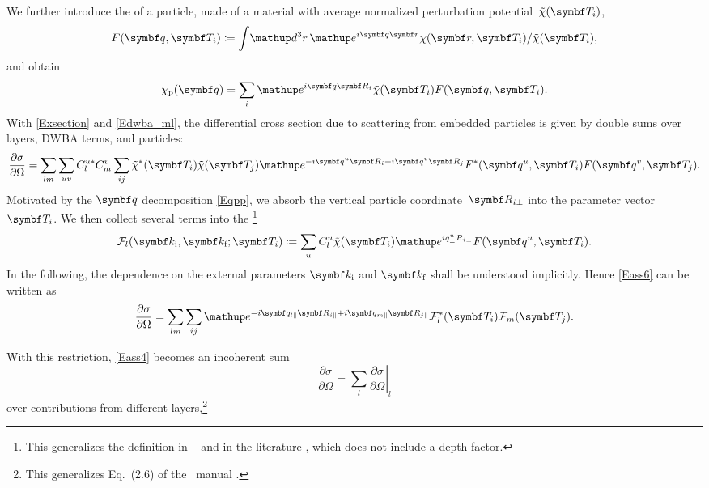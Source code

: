 We further introduce the 
%
of a particle,
made of a material
with average normalized perturbation potential~$\tilde\chi(\v{T}_i)$,
\begin{equation}\label{EFFdef}
  F(\q,\v{T}_i) \coloneqq  \int\!\d^3r\,\e^{i\q\r}\chi(\r,\v{T}_i)/\tilde\chi(\v{T}_i),
\end{equation}
and obtain
\begin{equation}
  \chi_\text{p}(\q) = \sum_i \e^{i\q\R_i} \tilde\chi(\v{T}_i) F(\q,\v{T}_i).
\end{equation}
With \cref{Exsection} and \cref{Edwba_ml},
the differential cross section due to scattering from embedded particles is
given by double sums over layers, DWBA terms, and particles:
\begin{equation}\label{Eass6}
  \frac{\partial\sigma}{\partial\Omega}
  = \sum_{lm} \sum_{uv} C^{u*}_l C^v_m \sum_{ij} \tilde\chi^*(\v{T}_i) \tilde\chi(\v{T}_j)
    \e^{-i\q^u \R_i +i \q^v \R_j} F^*(\q^u,\v{T}_i) F(\q^v,\v{T}_j).
\end{equation}
Motivated by the $\q$ decomposition \cref{Eqpp},
we absorb the vertical particle coordinate~$\R_{i\perp}$
into the parameter vector~$\v{T}_i$.
We then collect several terms into the \footnote
{This generalizes the definition in \IsGISAXS\ \cite[Sec.~2.4.1]{Laz08}
  and in the literature \cite[p.~292]{ReLL09},
which does not include a depth factor.}
\begin{equation}
  \FD_l(\k_\ti,\k_\tf;\v{T}_i)
  \coloneqq  \sum_u C^u_l\tilde\chi(\v{T}_i) \e^{iq^u_\perp R_{i\perp}} F(\q^u,\v{T}_i).
\end{equation}
In the following, the dependence on the external parameters
$\k_\ti$ and $\k_\tf$ shall be understood implicitly.
Hence \cref{Eass6} can be written as
\begin{equation}\label{Eass4}
  \frac{\partial\sigma}{\partial\Omega}
  = \sum_{lm} \sum_{ij} \e^{-i\q_{l\plll}\R_{i\plll}+i\q_{m\plll}\R_{j\plll}}
    \FD^*_l(\v{T}_i) \FD_m(\v{T}_j).
\end{equation}

With this restriction, \cref{Eass4} becomes an incoherent sum
\begin{equation}
  \frac{\partial\sigma}{\partial\Omega}
  = \sum_{l} \left.\frac{\partial\sigma}{\partial\Omega}\right|_l
\end{equation}
over contributions from different layers,\footnote
{This generalizes Eq.~(2.6) of the \IsGISAXS\ manual \cite{Laz08}.}

